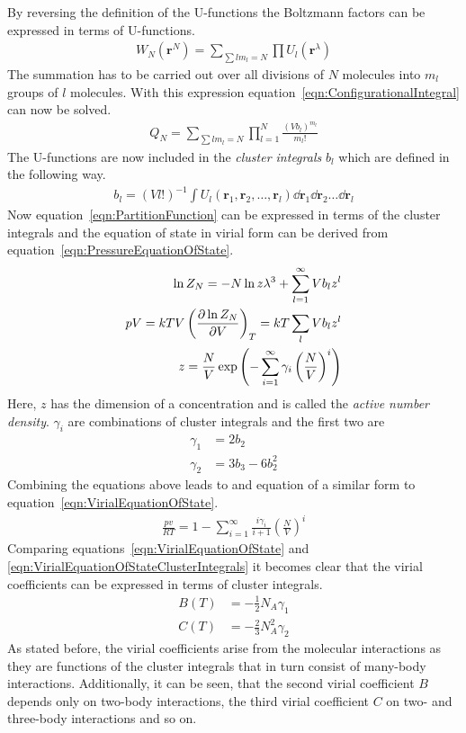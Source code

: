 By reversing the definition of the U-functions the Boltzmann factors can be
expressed in terms of U-functions.
%
\begin{align}
    W_N\left(\mathbf{r}^N\right)=\sum_{\sum lm_l=N}\prod U_l\left(\mathbf{r}^\lambda\right)
\end{align}
%
The summation has to be carried out over all divisions of $N$ molecules into
$m_l$ groups of $l$ molecules. With this expression
equation~\ref{eqn:ConfigurationalIntegral} can now be solved.
%
\begin{align}
    Q_N = \sum_{\sum lm_l=N} \prod_{l=1}^N\frac{(Vb_l)^{m_l}}{m_l!}\label{eqn:ConfigurationIntegralbl}
\end{align}
%
The U-functions are now included in the \textit{cluster integrals} $b_l$ which
are defined in the following way.
%
\begin{align}
    b_l=\left(Vl!\right)^{-1}\int U_l(\mathbf{r}_1,\mathbf{r}_2,\dots,\mathbf{r}_l)\dd{\mathbf{r}_1}\dd{\mathbf{r}_2}\dots\dd{\mathbf{r}_l}
\end{align}
%
Now equation~\ref{eqn:PartitionFunction} can be expressed in terms of the
cluster integrals and the equation of state in virial form can be derived from
equation~\ref{eqn:PressureEquationOfState}.
%
\begin{align}
    \ln Z_N=-N\ln z\lambda^3 + \sum_{l=1}^\infty Vb_lz^l\\
    pV=kTV\left(\pdv{\ln Z_N}{V}\right)_T=kT\sum_lVb_lz^l\\
    z=\frac{N}{V}\exp\left(-\sum_{i=1}^\infty\gamma_i\left(\frac{N}{V}\right)^i\right)
\end{align}
%
Here, $z$ has the dimension of a concentration and is called the \textit{active
number density}. $\gamma_i$ are combinations of cluster integrals and the first two are
%
\begin{align}
    \gamma_1&=2b_2\\
    \gamma_2&=3b_3-6b_2^2
\end{align}
%
Combining the equations above leads to and equation of a
similar form to equation~\ref{eqn:VirialEquationOfState}.
%
\begin{align}
    \frac{pv}{RT}=1-\sum_{i=1}^\infty\frac{i\gamma_i}{i+1}\left(\frac{N}{V}\right)^i\label{eqn:VirialEquationOfStateClusterIntegrals}
\end{align}
%
Comparing equations~\ref{eqn:VirialEquationOfState} and
\ref{eqn:VirialEquationOfStateClusterIntegrals} it becomes clear that the
virial coefficients can be expressed in terms of cluster integrals.
%
\begin{align}
    B(T)&=-\frac{1}{2}N_A\gamma_1\\
    C(T)&=-\frac{2}{3}N_A^2\gamma_2
\end{align}
%
As stated before, the virial coefficients arise from the molecular interactions
as they are functions of the cluster integrals that in turn consist of
many-body interactions. Additionally, it can be seen, that the second virial
coefficient $B$ depends only on two-body interactions, the third virial
coefficient $C$ on two- and three-body interactions and so on.

